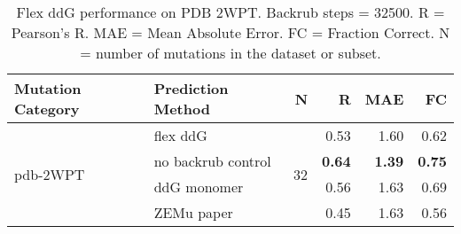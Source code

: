 \begin{table}
  \begin{tabular}{llrrrr}
\toprule
Mutation Category &   Prediction Method &   N &    R &  MAE &   FC \\
\midrule
 \multirow{ 4}{*}{pdb-2WPT} & flex ddG & \multirow{ 4}{*}{32} & 0.53 & 1.60 & 0.62  \\
 & no backrub control & & \textbf{0.64} & \textbf{1.39} & \textbf{0.75}  \\
 & ddG monomer & & 0.56 & 1.63 & 0.69  \\
 & ZEMu paper & & 0.45 & 1.63 & 0.56  \\
\bottomrule
\end{tabular}
  \caption[Flex ddG performance on PDB 2WPT]{
    Flex ddG performance on PDB 2WPT. Backrub steps = 32500. R = Pearson's R. MAE = Mean Absolute Error. FC = Fraction Correct. N = number of mutations in the dataset or subset.
  } \label{tab:table-pdb-2WPT}
\end{table}
